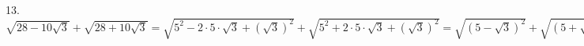 13. $\sqrt{28-10\sqrt{3}}+\sqrt{28+10\sqrt{3}}=\sqrt{5^2-2\cdot5\cdot\sqrt{3}+(\sqrt{3})^2}+\sqrt{5^2+2\cdot5\cdot\sqrt{3}+(\sqrt{3})^2}=\sqrt{(5-\sqrt{3})^2}+
\sqrt{(5+\sqrt{3})^2}=|5-\sqrt{3}|+|5+\sqrt{3}|=5-\sqrt{3}+5+\sqrt{3}=10.$\\
